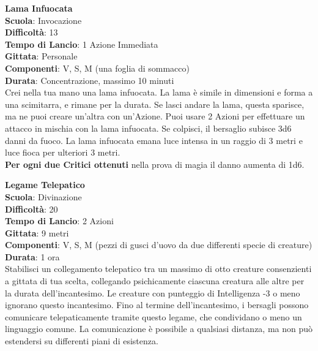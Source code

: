 \begin{multicols}{2}
\medskip\textbf{Lama Infuocata}\\
\textbf{Scuola}: Invocazione\\
\textbf{Difficoltà}: 13\\
\textbf{Tempo di Lancio}: 1 Azione Immediata\\
\textbf{Gittata}: Personale\\
\textbf{Componenti}: V, S, M (una foglia di sommacco)\\
\textbf{Durata}: Concentrazione, massimo 10 minuti \\
Crei nella tua mano una lama infuocata. La lama è simile in dimensioni e forma a una scimitarra, e rimane per la durata. Se lasci andare la lama, questa sparisce, ma ne puoi creare un'altra con un'Azione. Puoi usare 2 Azioni per effettuare un attacco in mischia con la lama infuocata. Se colpisci, il bersaglio subisce 3d6 danni da fuoco. La lama infuocata emana luce intensa in un raggio di 3 metri e luce fioca per ulteriori 3 metri.\\
\textbf{Per ogni due Critici ottenuti} nella prova di magia il danno aumenta di 1d6.

\medskip\textbf{Legame Telepatico}\\
\textbf{Scuola}: Divinazione\\
\textbf{Difficoltà}: 20\\
\textbf{Tempo di Lancio}: 2 Azioni\\
\textbf{Gittata}: 9 metri\\
\textbf{Componenti}: V, S, M (pezzi di gusci d'uovo da due differenti specie di creature)\\
\textbf{Durata}: 1 ora\\
Stabilisci un collegamento telepatico tra un massimo di otto creature consenzienti a gittata di tua scelta, collegando psichicamente ciascuna creatura alle altre per la durata dell'incantesimo. Le creature con punteggio di Intelligenza -3 o meno ignorano questo incantesimo. Fino al termine dell'incantesimo, i bersagli possono comunicare telepaticamente tramite questo legame, che condividano o meno un linguaggio comune. La comunicazione è possibile a qualsiasi distanza, ma non può estendersi su differenti piani di esistenza.


\end{multicols}
